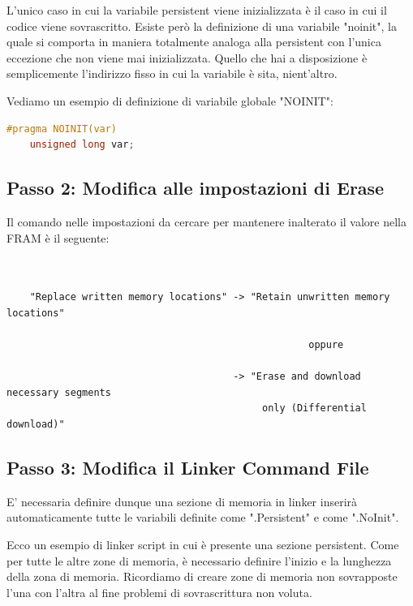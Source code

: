\documentclass[LaM,binding=0.6cm]{../sapthesis}
\begin{document}
L'unico caso in cui la variabile persistent viene inizializzata è il caso in cui il codice viene sovrascritto.
Esiste però la definizione di una variabile "noinit", la quale si comporta in maniera totalmente analoga alla persistent con
l'unica eccezione che non viene mai inizializzata.
Quello che hai a disposizione è semplicemente l'indirizzo fisso in cui la variabile è sita, nient'altro.

Vediamo un esempio di definizione di variabile globale "NOINIT":
\begin{lstlisting}[language=C]
    #pragma NOINIT(var)  
    unsigned long var;  
\end{lstlisting}

\subsection{Passo 2: Modifica alle impostazioni di Erase}
Il comando nelle impostazioni da cercare per mantenere inalterato il valore nella FRAM è il seguente:
\begin{verbatim}
    

    "Replace written memory locations" -> "Retain unwritten memory locations"
    
                                                    oppure
                                                    
                                       -> "Erase and download necessary segments 
                                            only (Differential download)"

\end{verbatim}
\subsection{Passo 3: Modifica il Linker Command File}
E' necessaria definire dunque una sezione di memoria in linker inserirà automaticamente tutte le variabili definite come ".Persistent" e come ".NoInit".

Ecco un esempio di linker script in cui è presente una sezione persistent.
Come per tutte le altre zone di memoria, è necessario definire l'inizio e la lunghezza della zona di memoria. Ricordiamo 
di creare zone di memoria non sovrapposte l'una con l'altra al fine problemi di sovrascrittura non voluta.
\end{document}
